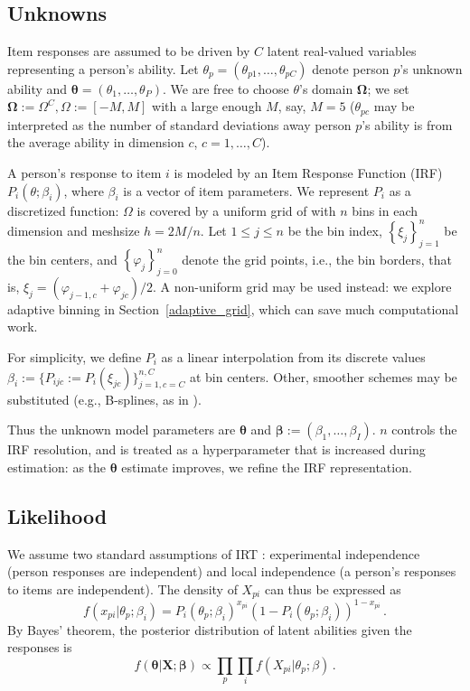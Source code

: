 \documentclass{article}
\newcommand{\bbeta}{\boldsymbol\beta}
\newcommand{\bta}{\boldsymbol\ta}
\newcommand{\bOmega}{\boldsymbol\Omega}
\newcommand{\ta}{\theta}
\newcommand{\bX}{\mathbf{X}}
\begin{document}
\subsection{Unknowns}
Item responses are assumed to be driven by $C$ latent real-valued variables representing a person's ability. Let $\ta_p=(\ta_{p1},\dots,\ta_{pC})$ denote person $p$'s unknown ability and $\bta = (\ta_1,\dots,\ta_P)$. We are free to choose $\ta$'s domain $\bOmega$; we set $\bOmega := \Omega^C, \Omega := [-M, M]$ with a large enough $M$, say, $M = 5$ ($\ta_{pc}$ may be interpreted as the number of standard deviations away person $p$'s ability is from the average ability in dimension $c$, $c=1,\dots,C$).

A person's response to item $i$ is modeled by an Item Response Function (IRF) $P_i(\ta;\beta_i)$, where $\beta_i$ is a vector of item parameters. We represent $P_i$ as a discretized function: $\Omega$ is covered by a uniform grid of with $n$ bins in each dimension and meshsize $h = 2 M / n$. Let $1 \leq j \leq n$ be the bin index, $\left\{\xi_{j} \right\}_{j=1}^n$ be the bin centers, and $\left\{\varphi_{j}\right\}_{j=0}^n$ denote the grid points, i.e., the bin borders, that is, $\xi_{j} = (\varphi_{j-1,c} + \varphi_{jc})/2$. A non-uniform grid may be used instead: we explore adaptive binning in Section~\ref{adaptive_grid}, which can save much computational work. 

For simplicity, we define $P_i$ as a linear interpolation from its discrete values $\beta_i := \{P_{ijc} := P_i(\xi_{jc})\}_{j=1,c=C}^{n,C}$ at bin centers. Other, smoother schemes may be substituted (e.g., B-splines, as in \cite{matt_bsplines}).

Thus the unknown model parameters are $\bta$ and $\bbeta := (\beta_1,\dots,\beta_I)$. $n$ controls the IRF resolution, and is treated as a hyperparameter that is increased during estimation: as the $\bta$ estimate improves, we refine the IRF representation.

\subsection{Likelihood}
We assume two standard assumptions of IRT \cite{junker}: experimental independence (person responses are independent) and local independence (a person's responses to items are independent). The density of $X_{pi}$ can thus be expressed as 
\begin{equation}
  f(x_{pi}|\ta_p;\beta_i) = P_i(\ta_p;\beta_i)^{x_{pi}} \left(1 - P_i(\ta_p;\beta_i)\right)^{1-x_{pi}}\,.
\end{equation}
By Bayes' theorem, the posterior distribution of latent abilities given the responses is
\begin{equation}
  f(\bta|\bX;\bbeta) \propto\prod_p \prod_i f(X_{pi}|\ta_p;\beta)\,.
  \label{like}
\end{equation}
\end{document}
